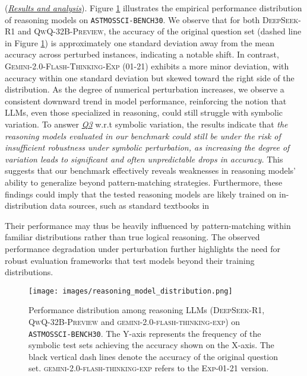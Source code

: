 \vspace{-0.5em}
(\textit{\underline{Results and analysis}}). 
Figure \ref{fig:reasoning_model_distribution} illustrates the empirical performance distribution of reasoning models on \texttt{ASTMOSSCI-BENCH30}. We observe that for both \textsc{DeepSeek-R1} and \textsc{QwQ-32B-Preview}, the accuracy of the original question set (dashed line in Figure \ref{fig:reasoning_model_distribution}) is approximately one standard deviation away from the mean accuracy across perturbed instances, indicating a notable shift. In contrast, \textsc{Gemini-2.0-Flash-Thinking-Exp (01-21)} exhibits a more minor deviation, with accuracy within one standard deviation but skewed toward the right side of the distribution.
As the degree of numerical perturbation increases, we observe a consistent downward trend in model performance, reinforcing the notion that LLMs, even those specialized in reasoning, could still struggle with symbolic variation. To answer \textit{\underline{Q3}} w.r.t symbolic variation, the results indicate that \textit{the reasoning models evaluated in our benchmark could still be under the risk of insufficient robustness under symbolic perturbation, as increasing the degree of variation leads to significant and often unpredictable drops in accuracy.} This suggests that our benchmark effectively reveals weaknesses in reasoning models' ability to generalize beyond pattern-matching strategies.
Furthermore, these findings could imply that the tested reasoning models are likely trained on in-distribution data sources, such as standard textbooks in \subject. Their performance may thus be heavily influenced by pattern-matching within familiar distributions rather than true logical reasoning. The observed performance degradation under perturbation further highlights the need for robust evaluation frameworks that test models beyond their training distributions. 



\begin{figure}[!ht]
    \centering
    \texttt{[image: images/reasoning\_model\_distribution.png]}
    \caption{Performance distribution among reasoning LLMs (\textsc{DeepSeek-R1}, \textsc{QwQ-32B-Preview} and \textsc{gemini-2.0-flash-thinking-exp}) on \texttt{ASTMOSSCI-BENCH30}. The Y-axis represents the frequency of the symbolic test sets achieving the accuracy shown on the X-axis. The black vertical dash lines denote the accuracy of the original question set. \textsc{gemini-2.0-flash-thinking-exp} refers to the \textsc{Exp-01-21} version.}
    \label{fig:reasoning_model_distribution}
    \vspace{-1.0em}
\end{figure}





